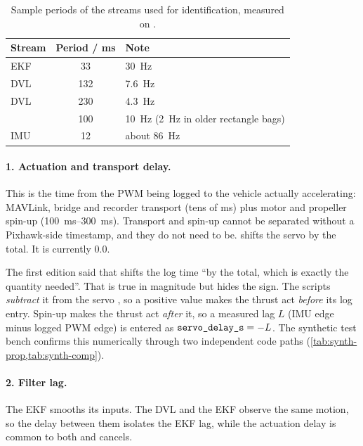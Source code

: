 \begin{table}[htbp]
\centering
\caption{Sample periods of the streams used for identification, measured on
.}
\label{tab:rates}
\begin{tabular}{@{}l S[table-format=3.0] l@{}}
\toprule
Stream & {Period / \unit{\milli\second}} & Note \\
\midrule
EKF  & 33 & \qty{30}{\hertz} \\
DVL  & 132 & \qty{7.6}{\hertz} \\
DVL  & 230 & \qty{4.3}{\hertz} \\
 & 100 & \qty{10}{\hertz} (\qty{2}{\hertz} in older rectangle bags) \\
IMU  & 12 & about \qty{86}{\hertz} \\
\bottomrule
\end{tabular}
\end{table}
\FloatBarrier

\paragraph{1. Actuation and transport delay.} This is the time from the PWM being logged to
the vehicle actually accelerating: MAVLink, bridge and recorder transport (tens of
\unit{\milli\second}) plus motor and propeller spin-up (\qtyrange{100}{300}{\milli\second}). Transport and
spin-up cannot be separated without a Pixhawk-side timestamp, and they do not need to be.
 shifts the servo  by the total. It is currently \num{0.0}.

\begin{revised}[title=Revised 14 October 2026: the sign of \code{servo_delay_s}]
The first edition said that  shifts the log time ``by the total, which is
exactly the quantity needed''. That is true in magnitude but hides the sign. The scripts
\emph{subtract} it from the servo , so a positive value makes the thrust act
\emph{before} its log entry. Spin-up makes the thrust act \emph{after} it, so a measured lag
$L$ (IMU edge minus logged PWM edge) is entered as $\code{servo_delay_s} = -L$. The synthetic
test bench confirms this numerically through two independent code paths (\cref{tab:synth-prop,tab:synth-comp}).
\end{revised}

\paragraph{2. Filter lag.} The EKF smooths its inputs. The DVL and the EKF observe the same
motion, so the delay between them isolates the EKF lag, while the actuation delay is common
to both and cancels.

